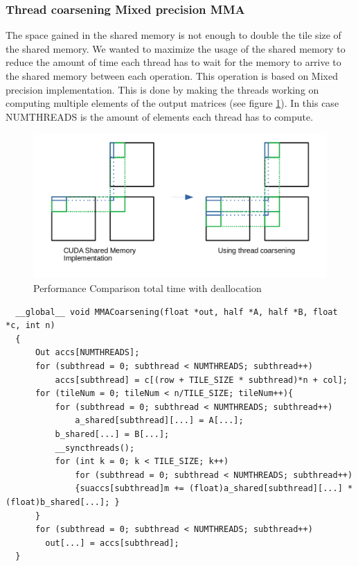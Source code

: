 \documentclass[conference]{IEEEtran}
\begin{document}
  \subsubsection[short]{Thread coarsening Mixed precision MMA}
  The space gained in the shared memory is not enough to double the tile size of the shared memory. We wanted 
  to maximize the usage of the shared memory to reduce the amount of time each thread has to wait for the memory
  to arrive to the shared memory between each operation. This operation is based on Mixed precision implementation.
  This is done by making the threads working on computing multiple elements of the output matrices (see figure \ref{fig:thread-coars}). In this case
  NUMTHREADS is the amount of elements each thread has to compute.
  \begin{figure}[h]
    \centering
    \includegraphics[scale=0.2]{figures/threadCoarsening.png}
    \caption{Performance Comparison total time with deallocation}
    \label{fig:thread-coars}
  \end{figure}

  \begin{lstlisting}
  __global__ void MMACoarsening(float *out, half *A, half *B, float *c, int n)
  {   
      Out accs[NUMTHREADS];
      for (subthread = 0; subthread < NUMTHREADS; subthread++)
          accs[subthread] = c[(row + TILE_SIZE * subthread)*n + col];
      for (tileNum = 0; tileNum < n/TILE_SIZE; tileNum++){
          for (subthread = 0; subthread < NUMTHREADS; subthread++)
              a_shared[subthread][...] = A[...];
          b_shared[...] = B[...];
          __syncthreads();
          for (int k = 0; k < TILE_SIZE; k++)
              for (subthread = 0; subthread < NUMTHREADS; subthread++)
              {suaccs[subthread]m += (float)a_shared[subthread][...] * (float)b_shared[...]; }
      }
      for (subthread = 0; subthread < NUMTHREADS; subthread++)
        out[...] = accs[subthread];
  }
  \end{lstlisting}
  
\end{document}
